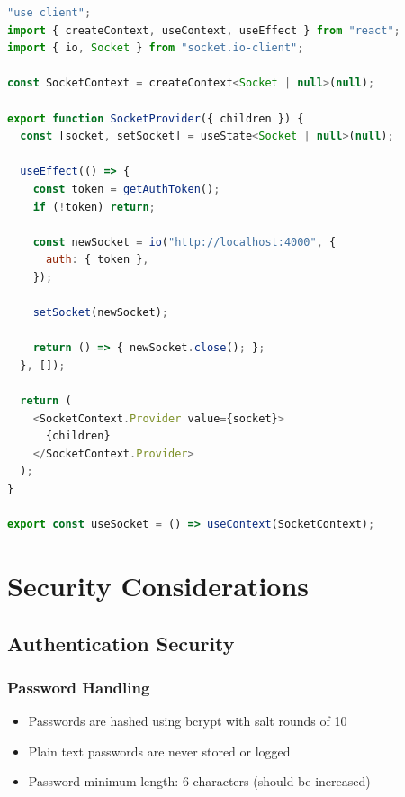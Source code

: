 \documentclass[12pt,a4paper]{report}
\begin{document}
\begin{lstlisting}[language=JavaScript, caption=SocketContext Provider]
"use client";
import { createContext, useContext, useEffect } from "react";
import { io, Socket } from "socket.io-client";

const SocketContext = createContext<Socket | null>(null);

export function SocketProvider({ children }) {
  const [socket, setSocket] = useState<Socket | null>(null);
  
  useEffect(() => {
    const token = getAuthToken();
    if (!token) return;
    
    const newSocket = io("http://localhost:4000", {
      auth: { token },
    });
    
    setSocket(newSocket);
    
    return () => { newSocket.close(); };
  }, []);
  
  return (
    <SocketContext.Provider value={socket}>
      {children}
    </SocketContext.Provider>
  );
}

export const useSocket = () => useContext(SocketContext);
\end{lstlisting}

\chapter{Security Considerations}

\section{Authentication Security}

\subsection{Password Handling}

\begin{itemize}
    \item Passwords are hashed using bcrypt with salt rounds of 10
    \item Plain text passwords are never stored or logged
    \item Password minimum length: 6 characters (should be increased)
\end{itemize}
\end{document}
